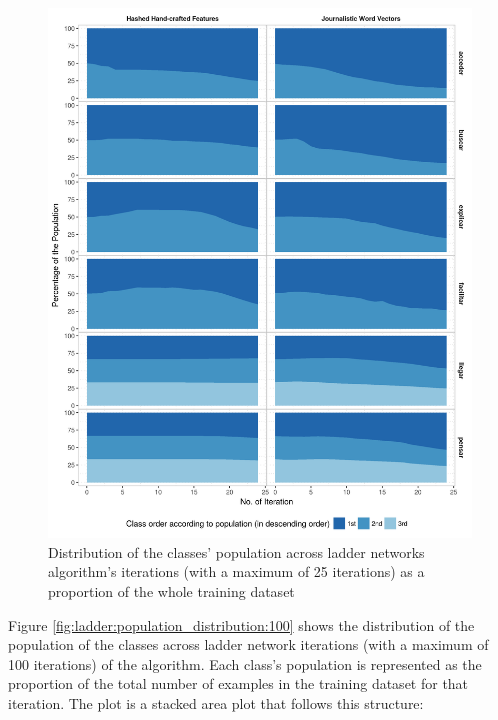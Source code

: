 \begin{figure}[hb!]
  \centering
  \includegraphics[height=0.9\textheight,width=\textwidth,keepaspectratio]
    {plots/ladder/population_distribution_25}
  \caption{Distribution of the classes' population across ladder networks
  algorithm's iterations (with a maximum of 25 iterations) as a proportion of
  the whole training dataset}
  \label{fig:ladder:population_distribution:25}
\end{figure}

Figure \ref{fig:ladder:population_distribution:100} shows the distribution of
the population of the classes across ladder network iterations (with a maximum
of 100 iterations) of the algorithm. Each class's population is represented as
the proportion of the total number of examples in the training dataset for that
iteration. The plot is a stacked area plot that follows this structure:

